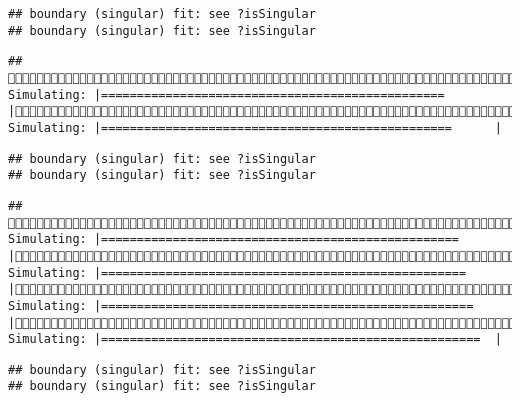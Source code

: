 \documentclass[]{article}
\begin{document}
\begin{verbatim}
## boundary (singular) fit: see ?isSingular
## boundary (singular) fit: see ?isSingular
\end{verbatim}

\begin{verbatim}
## (1/4) Simulating: |================================================       |(1/4) Simulating: |=================================================      |
\end{verbatim}

\begin{verbatim}
## boundary (singular) fit: see ?isSingular
## boundary (singular) fit: see ?isSingular
\end{verbatim}

\begin{verbatim}
## (1/4) Simulating: |==================================================     |(1/4) Simulating: |===================================================    |(1/4) Simulating: |====================================================   |(1/4) Simulating: |=====================================================  |
\end{verbatim}

\begin{verbatim}
## boundary (singular) fit: see ?isSingular
## boundary (singular) fit: see ?isSingular
\end{verbatim}
\end{document}
